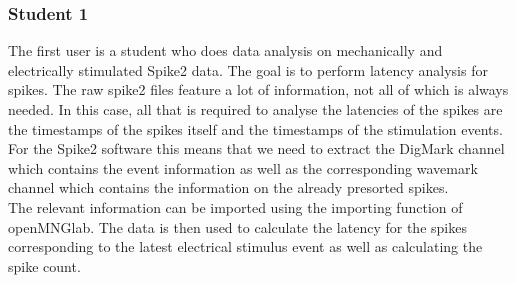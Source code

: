 \subsubsection{Student 1}

The first user is a student who does data analysis on mechanically and electrically stimulated Spike2 data. The goal is to perform latency analysis for spikes.  The raw spike2 files feature a lot of information, not all of which is always needed. In this case, all that is required to analyse the latencies of the spikes are the timestamps of the spikes itself and the timestamps of the stimulation events. For the Spike2 software this means that we need to extract the DigMark channel which contains the event information as well as the corresponding wavemark channel which contains the information on the already presorted spikes.\\
The relevant information can be imported using the importing function of openMNGlab. 
The data is then used to calculate the latency for the spikes corresponding to the latest electrical stimulus event as well as calculating the spike count.

